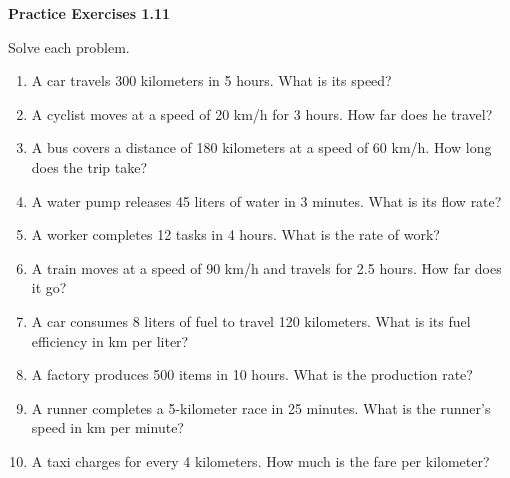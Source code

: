 \vspace{0.3ex}
\noindent\textbf{Practice Exercises 1.11}

\vspace{0.2ex}

Solve each problem.
\begin{enumerate}
    \item A car travels 300 kilometers in 5 hours. What is its speed?
    \item A cyclist moves at a speed of 20 km/h for 3 hours. How far does he travel?
    \item A bus covers a distance of 180 kilometers at a speed of 60 km/h. How long does the trip take?
    \item A water pump releases 45 liters of water in 3 minutes. What is its flow rate?
    \item A worker completes 12 tasks in 4 hours. What is the rate of work?
    \item A train moves at a speed of 90 km/h and travels for 2.5 hours. How far does it go?
    \item A car consumes 8 liters of fuel to travel 120 kilometers. What is its fuel efficiency in km per liter?
    \item A factory produces 500 items in 10 hours. What is the production rate?
    \item A runner completes a 5-kilometer race in 25 minutes. What is the runner's speed in km per minute?
    \item A taxi charges  for every 4 kilometers. How much is the fare per kilometer?
\end{enumerate}
